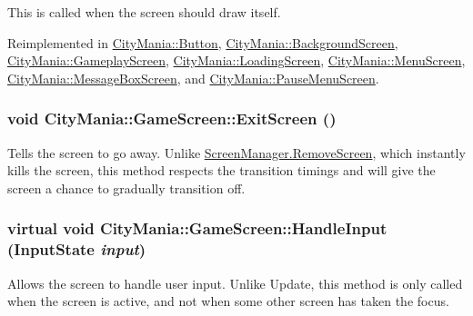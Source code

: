 This is called when the screen should draw itself. 

Reimplemented in \hyperlink{classCityMania_1_1Button_a48ed467fa9522c528d4369dc27fd1418}{CityMania::Button}, \hyperlink{classCityMania_1_1BackgroundScreen_ab1e98d9c96d18bc4395f6bbcc00a82b1}{CityMania::BackgroundScreen}, \hyperlink{classCityMania_1_1GameplayScreen_aff1697e936e9c230616cadcafbf410ee}{CityMania::GameplayScreen}, \hyperlink{classCityMania_1_1LoadingScreen_ad5f650a3e0ce04391c97347a738dab2f}{CityMania::LoadingScreen}, \hyperlink{classCityMania_1_1MenuScreen_a433f334c09ea523b02322bd153e960d1}{CityMania::MenuScreen}, \hyperlink{classCityMania_1_1MessageBoxScreen_a180792261ea11fe8d33271cc3e7d3c1d}{CityMania::MessageBoxScreen}, and \hyperlink{classCityMania_1_1PauseMenuScreen_a1daaf1e6d3dc66500fcf020c2098a675}{CityMania::PauseMenuScreen}.\hypertarget{classCityMania_1_1GameScreen_ada4a6b75da175b4286662d888eefc3e2}{
\subsubsection[{ExitScreen}]{\setlength{\rightskip}{0pt plus 5cm}void CityMania::GameScreen::ExitScreen ()}}
\label{classCityMania_1_1GameScreen_ada4a6b75da175b4286662d888eefc3e2}


Tells the screen to go away. Unlike \hyperlink{classCityMania_1_1ScreenManager_ae9d2ac095225f11261734ca461847242}{ScreenManager.RemoveScreen}, which instantly kills the screen, this method respects the transition timings and will give the screen a chance to gradually transition off. \hypertarget{classCityMania_1_1GameScreen_a80edab75e121f4e08b007f47206cf29c}{
\subsubsection[{HandleInput}]{\setlength{\rightskip}{0pt plus 5cm}virtual void CityMania::GameScreen::HandleInput ({\bf InputState} {\em input})}}
\label{classCityMania_1_1GameScreen_a80edab75e121f4e08b007f47206cf29c}


Allows the screen to handle user input. Unlike Update, this method is only called when the screen is active, and not when some other screen has taken the focus. 


